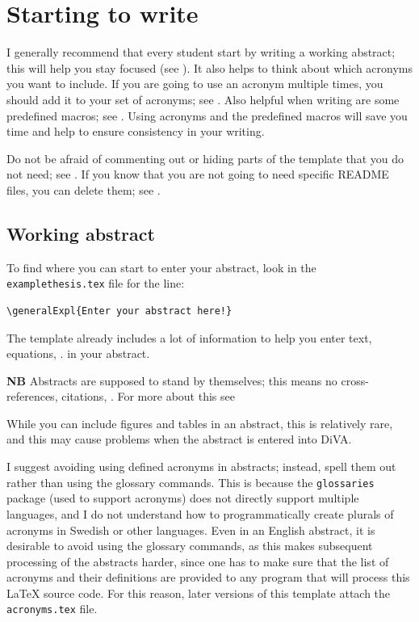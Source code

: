 \documentclass[12pt, twoside]{article}
\newcommand{\fname}[1]{\texttt{#1}}
\begin{document}
\section{Starting to write}
\label{sec:cycle3startingToWrite}
I generally recommend that every student start by writing a working abstract; this will help you stay focused (see ).
It also helps to think about which acronyms you want to include. If you are going to use an acronym multiple times, you should add it to your set of acronyms; see . Also helpful when writing are some predefined macros; see . Using acronyms and the predefined macros will save you time and help to ensure consistency in your writing.

Do not be afraid of commenting out or hiding parts of the template that you do not need; see . If you know that you are not going to need specific README files, you can delete them; see .

\subsection{Working abstract}
\label{sec:cycle3wrtingFirstAbstract}
To find where you can start to enter your abstract, look in the \fname{examplethesis.tex} file for the line:
\begin{lstlisting}[style=latexExampleForAuthors]
\generalExpl{Enter your abstract here!}
\end{lstlisting}

The template already includes a lot of information to help you enter text, equations, \etc. in your abstract.
\medskip

\noindent\textbf{NB} Abstracts are supposed to stand by themselves; this means no cross-references, citations, \etc. For more about this see 
\medskip

While you can include figures and tables in an abstract, \first this is relatively rare, and \Second this may cause problems when the abstract is entered into \gls{DiVA}.

I suggest avoiding using defined acronyms in abstracts; instead, spell them out rather than using the glossary commands. This is because the \texttt{glossaries} package (used to support acronyms) does not directly support multiple languages, and I do not understand how to programmatically create plurals of acronyms in Swedish or other languages. Even in an English abstract, it is desirable to avoid using the glossary commands, as this makes subsequent processing of the abstracts harder, since one has to make sure that the list of acronyms and their definitions are provided to any program that will process this \LaTeX{}  source code. For this reason, later versions of this template attach the \fname{acronyms.tex} file.
\end{document}
